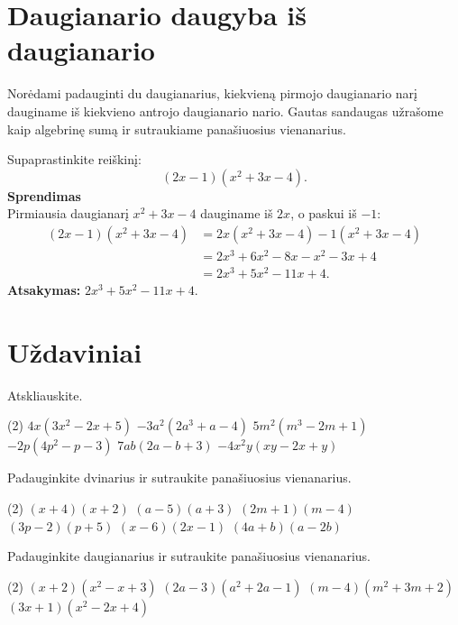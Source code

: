 \documentclass[11pt,a4paper]{scrartcl}
\begin{document}
\section{Daugianario daugyba iš daugianario}

\begin{property}
Norėdami padauginti du daugianarius, kiekvieną pirmojo daugianario narį dauginame iš kiekvieno antrojo daugianario nario. Gautas sandaugas užrašome kaip algebrinę sumą ir sutraukiame panašiuosius vienanarius.
\end{property}

\begin{example}
Supaprastinkite reiškinį:
\[
(2x-1)(x^2+3x-4).
\]
\textbf{Sprendimas}\\
Pirmiausia daugianarį $x^2+3x-4$ dauginame iš $2x$, o paskui iš $-1$:
\[
\begin{aligned}
(2x-1)(x^2+3x-4)
&=2x(x^2+3x-4)-1(x^2+3x-4) \\
&=2x^3+6x^2-8x-x^2-3x+4 \\
&=2x^3+5x^2-11x+4.
\end{aligned}
\]
\textbf{Atsakymas:} $2x^3+5x^2-11x+4$.
\end{example}

\section{Uždaviniai}

\begin{problem}
Atskliauskite.
\begin{tasks}[label={(\arabic*)}, label-offset=0.9em](2)
	\task $4x(3x^2-2x+5)$
	\task $-3a^2(2a^3+a-4)$
	\task $5m^2(m^3-2m+1)$
	\task $-2p(4p^2-p-3)$
	\task $7ab(2a-b+3)$
	\task $-4x^2y(xy-2x+y)$
\end{tasks}
\end{problem}

\begin{problem}
Padauginkite dvinarius ir sutraukite panašiuosius vienanarius.
\begin{tasks}[label={(\arabic*)}, label-offset=0.9em](2)
	\task $(x+4)(x+2)$
	\task $(a-5)(a+3)$
	\task $(2m+1)(m-4)$
	\task $(3p-2)(p+5)$
	\task $(x-6)(2x-1)$
	\task $(4a+b)(a-2b)$
\end{tasks}
\end{problem}

\begin{problem}
Padauginkite daugianarius ir sutraukite panašiuosius vienanarius.
\begin{tasks}[label={(\arabic*)}, label-offset=0.9em](2)
	\task $(x+2)(x^2-x+3)$
	\task $(2a-3)(a^2+2a-1)$
	\task $(m-4)(m^2+3m+2)$
	\task $(3x+1)(x^2-2x+4)$
\end{tasks}
\end{problem}
\end{document}
